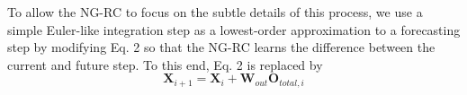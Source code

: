 \documentclass[11pt, oneside]{article}
\begin{document}
To allow the NG-RC to focus on the subtle details of this process, we use a simple Euler-like integration step as a lowest-order approximation to a forecasting step by modifying Eq. 2 so that the NG-RC learns the difference between the current and future step. To this end, Eq. 2 is replaced by
\begin{equation}
    \mathbf{X}_{i+1} = \mathbf{X}_i + \mathbf{W}_{out} \mathbf{O}_{total,i}
\end{equation}

\clearpage
\printbibliography
\end{document}
